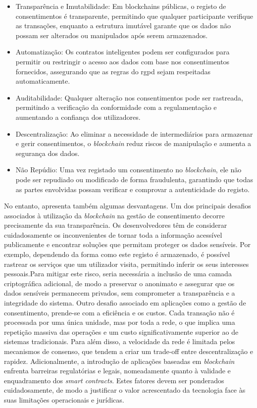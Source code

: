 \begin{itemize}
    \item Transparência e Imutabilidade: Em blockchains públicas, o registo de consentimentos é transparente, permitindo que qualquer participante verifique as transações, enquanto a estrutura imutável garante que os dados não possam ser alterados ou manipulados após serem armazenados.
    \item Automatização: Os contratos inteligentes podem ser configurados para permitir ou restringir o acesso aos dados com base nos consentimentos fornecidos, assegurando que as regras do \acrshort{rgpd} sejam respeitadas automaticamente.
    \item Auditabilidade: Qualquer alteração nos consentimentos pode ser rastreada, permitindo a verificação da conformidade com a regulamentação e aumentando a confiança dos utilizadores.
    \item Descentralização: Ao eliminar a necessidade de intermediários para armazenar e gerir consentimentos, o \textit{blockchain} reduz riscos de manipulação e aumenta a segurança dos dados.
    \item Não Repúdio: Uma vez registado um consentimento no \textit{blockchain}, ele não pode ser repudiado ou modificado de forma fraudulenta, garantindo que todas as partes envolvidas possam verificar e comprovar a autenticidade do registo.
\end{itemize}

No entanto, apresenta também algumas desvantagens. Um dos principais desafios associados à utilização da \textit{blockchain} na gestão de consentimento decorre precisamente da sua transparência. Os desenvolvedores têm de considerar cuidadosamente os inconvenientes de tornar toda a informação acessível publicamente e encontrar soluções que permitam proteger os dados sensíveis. Por exemplo, dependendo da forma como este registo é armazenado, é possível rastrear os serviços que um utilizador visita, permitindo inferir os seus interesses pessoais.Para mitigar este risco, seria necessária a inclusão de uma camada criptográfica adicional, de modo a preservar o anonimato e assegurar que os dados sensíveis permanecem privados, sem comprometer a transparência e a integridade do sistema.
Outro desafio associado em aplicações como a gestão de consentimento, prende-se com a eficiência e os custos. Cada transação não é processada por uma única unidade, mas por toda a rede, o que implica uma repetição massiva das operações e um custo significativamente superior ao de sistemas tradicionais. Para além disso, a velocidade da rede é limitada pelos mecanismos de consenso, que tendem a criar um trade-off entre descentralização e rapidez. Adicionalmente, a introdução de aplicações baseadas em \textit{blockchain} enfrenta barreiras regulatórias e legais, nomeadamente quanto à validade e enquadramento dos \textit{smart contracts}. Estes fatores devem ser ponderados cuidadosamente, de modo a justificar o valor acrescentado da tecnologia face às suas limitações operacionais e jurídicas.

